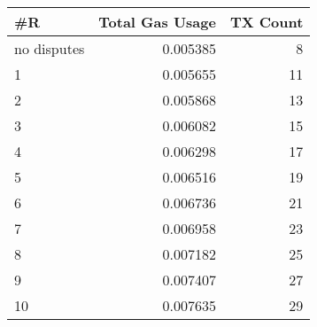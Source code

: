 \begin{tabular}{lrr}
\toprule
         \#R &  Total Gas Usage &  TX Count \\
\midrule
no disputes &         0.005385 &         8 \\
          1 &         0.005655 &        11 \\
          2 &         0.005868 &        13 \\
          3 &         0.006082 &        15 \\
          4 &         0.006298 &        17 \\
          5 &         0.006516 &        19 \\
          6 &         0.006736 &        21 \\
          7 &         0.006958 &        23 \\
          8 &         0.007182 &        25 \\
          9 &         0.007407 &        27 \\
         10 &         0.007635 &        29 \\
\bottomrule
\end{tabular}
